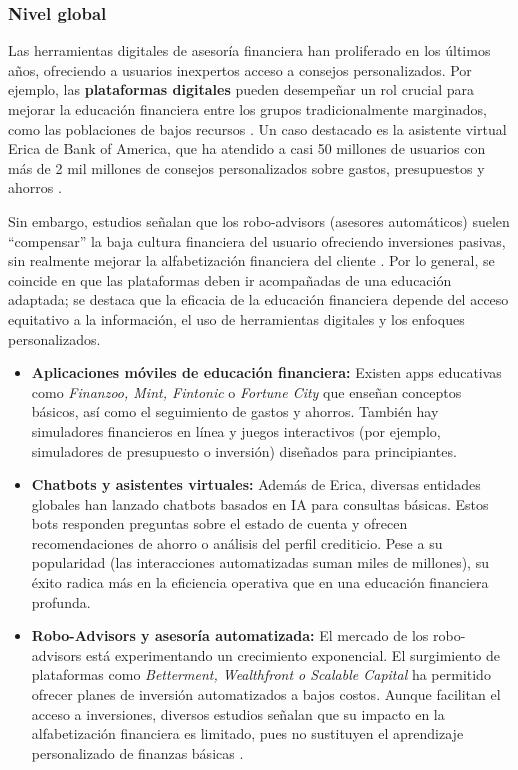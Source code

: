 \subsubsection*{Nivel global}
Las herramientas digitales de asesoría financiera han proliferado en los últimos años, ofreciendo a usuarios inexpertos acceso a consejos personalizados. Por ejemplo, las \textbf{plataformas digitales} pueden desempeñar un rol crucial para mejorar la educación financiera entre los grupos tradicionalmente marginados, como las poblaciones de bajos recursos \parencite[p. 28]{RevistaCientifica01}. Un caso destacado es la asistente virtual Erica de Bank of America, que ha atendido a casi 50 millones de usuarios con más de 2 mil millones de consejos personalizados sobre gastos, presupuestos y ahorros \parencite{FundsSociety01}. 

Sin embargo, estudios señalan que los robo-advisors (asesores automáticos) suelen ``compensar'' la baja cultura financiera del usuario ofreciendo inversiones pasivas, sin realmente mejorar la alfabetización financiera del cliente \parencite[p. 5-6]{RoboAdvisors01}. Por lo general, se coincide en que las plataformas deben ir acompañadas de una educación adaptada; se destaca que la eficacia de la educación financiera depende del acceso equitativo a la información, el uso de herramientas digitales y los enfoques personalizados.

\begin{itemize}
	\item \textbf{Aplicaciones móviles de educación financiera:} Existen apps educativas como \textit{Finanzoo, Mint, Fintonic} o \textit{Fortune City} que enseñan conceptos básicos, así como el seguimiento de gastos y ahorros. También hay simuladores financieros en línea y juegos interactivos (por ejemplo, simuladores de presupuesto o inversión) diseñados para principiantes.
	
	\item \textbf{Chatbots y asistentes virtuales:} Además de Erica, diversas entidades globales han lanzado chatbots basados en IA para consultas básicas. Estos bots responden preguntas sobre el estado de cuenta y ofrecen recomendaciones de ahorro o análisis del perfil crediticio. Pese a su popularidad (las interacciones automatizadas suman miles de millones), su éxito radica más en la eficiencia operativa que en una educación financiera profunda.
	
	\item \textbf{Robo-Advisors y asesoría automatizada:} El mercado de los robo-advisors está experimentando un crecimiento exponencial. El surgimiento de plataformas como \textit{Betterment, Wealthfront o Scalable Capital} ha permitido ofrecer planes de inversión automatizados a bajos costos. Aunque facilitan el acceso a inversiones, diversos estudios señalan que su impacto en la alfabetización financiera es limitado, pues no sustituyen el aprendizaje personalizado de finanzas básicas \parencite[p. 5-6]{RoboAdvisors01}.
\end{itemize}

